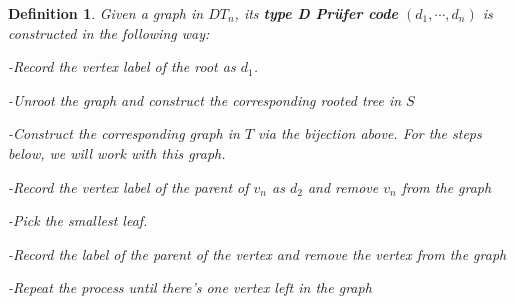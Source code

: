 \documentclass[11pt]{amsart}
\newtheorem{defi}[thm]{Definition}%
\begin{document}
\begin{defi}
    Given a graph in $DT_n$, its \textbf{type D Pr\"{u}fer code} $(d_1,\cdots,d_n)$ is constructed in the following way:

    -Record the vertex label of the root as $d_1$.

    -Unroot the graph and construct the corresponding rooted tree in $S$
    
    -Construct the corresponding graph in $T$ via the bijection above. For the steps below, we will work with this graph.

    -Record the vertex label of the parent of $v_n$ as $d_2$ and remove $v_n$ from the graph
    
    -Pick the smallest leaf.

    -Record the label of the parent of the vertex and remove the vertex from the graph

    -Repeat the process until there's one vertex left in the graph
\end{defi}
\end{document}
